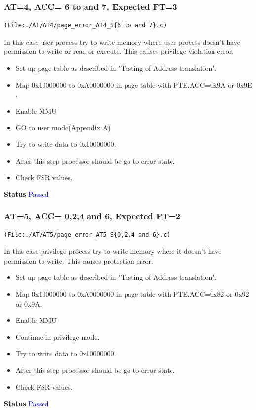 \documentclass[12pt,a4paper]{article}
\begin{document}
\subsubsection{ AT=4, ACC= 6 to and 7, Expected FT=3}
\begin{lstlisting}
(File:./AT/AT4/page_error_AT4_S{6 to and 7}.c)
\end{lstlisting}
In this case user process try to write memory where user process doesn't have permission to write or read or execute. This causes privilege violation error.

\begin{itemize}
\item Set-up page table as described in "Testing of Address translation".
\item Map 0x10000000 to 0xA0000000 in page table with PTE.ACC=0x9A or 0x9E  .
\item Enable MMU
\item GO to user mode(Appendix A) 
\item Try to write data to 0x10000000.
\item After this step processor should be go to error state.
\item Check FSR values.
\end{itemize}
\textbf{Status} \textcolor{blue}{Passed}
\subsubsection{ AT=5, ACC= 0,2,4 and 6, Expected FT=2}
\begin{lstlisting}
(File:./AT/AT5/page_error_AT5_S{0,2,4 and 6}.c)
\end{lstlisting}
In this case privilege process try to write memory where it doesn't have permission to write. This causes protection error.

\begin{itemize}
\item Set-up page table as described in "Testing of Address translation".
\item Map 0x10000000 to 0xA0000000 in page table with PTE.ACC=0x82 or 0x92 or 0x9A.
\item Enable MMU
\item Continue in privilege mode. 
\item Try to write data to 0x10000000.
\item After this step processor should be go to error state.
\item Check FSR values.
\end{itemize}
\textbf{Status} \textcolor{blue}{Passed}
\end{document}

